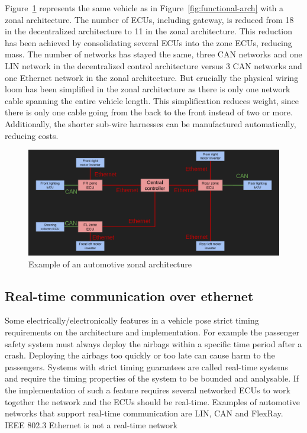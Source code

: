 Figure~\ref{fig:zonal-arch} represents the same vehicle as in Figure~\ref{fig:functional-arch} with a zonal architecture. The number of ECUs, including gateway, is reduced from 18 in the decentralized architecture to 11 in the zonal architecture. This reduction has been achieved by consolidating several ECUs into the zone ECUs, reducing mass. The number of networks has stayed the same, three CAN networks and one LIN network in the decentralized control architecture versus 3 CAN networks and one Ethernet network in the zonal architecture. But crucially the physical wiring loom has been simplified in the zonal architecture as there is only one network cable spanning the entire vehicle length. This simplification reduces weight, since there is only one cable going from the back to the front instead of two or more. Additionally, the shorter sub-wire harnesses can be manufactured automatically, reducing costs.

\begin{figure}[htb]
    \centering
    \includegraphics[width=\textwidth]{images/zone-arch.png}
    \caption{Example of an automotive zonal architecture}
    \label{fig:zonal-arch}
\end{figure}

\subsection{Real-time communication over ethernet}
Some electrically/electronically features in a vehicle pose strict timing requirements on the architecture and implementation. For example the passenger safety system must always deploy the airbags within a specific time period after a crash. Deploying the airbags too quickly or too late can cause harm to the passengers. Systems with strict timing guarantees are called real-time systems and require the timing properties of the system to be bounded and analysable. If the implementation of such a feature requires several networked ECUs to work together the network and the ECUs should be real-time. Examples of automotive networks that support real-time communication are LIN, CAN and FlexRay. IEEE 802.3 Ethernet is not a real-time network
\vfill